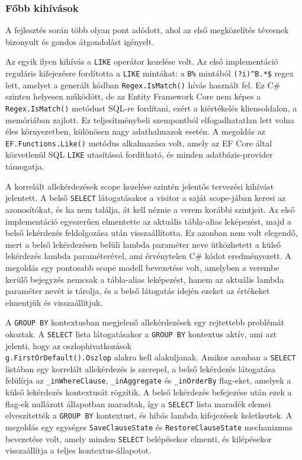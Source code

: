 \documentclass[a4paper,12pt]{article}
\begin{document}
\subsubsection{Főbb kihívások}

A fejlesztés során több olyan pont adódott, ahol az első megközelítés tévesnek bizonyult és gondos átgondolást igényelt.

Az egyik ilyen kihívás a \texttt{LIKE} operátor kezelése volt. Az első implementáció reguláris kifejezésre fordította a \texttt{LIKE} mintákat: a \texttt{B\%} mintából \texttt{(?i)\^{}B.*\$} regex lett, amelyet a generált kódban \texttt{Regex.IsMatch()} hívás használt fel. Ez C\# szinten helyesen működött, de az Entity Framework Core nem képes a \texttt{Regex.IsMatch()} metódust SQL-re fordítani, ezért a kiértékelés kliensoldalon, a memóriában zajlott. Ez teljesítménybeli szempontból elfogadhatatlan lett volna éles környezetben, különösen nagy adathalmazok esetén. A megoldás az \texttt{EF.Functions.Like()} metódus alkalmazása volt, amely az EF Core által közvetlenül SQL \texttt{LIKE} utasítássá fordítható, és minden adatbázis-provider támogatja.

A korrelált allekérdezések scope kezelése szintén jelentős tervezési kihívást jelentett. A belső \texttt{SELECT} látogatásakor a visitor a saját scope-jában keresi az azonosítókat, és ha nem találja, át kell néznie a verem korábbi szintjeit. Az első implementáció egyszerűen elmentette az aktuális tábla-alias leképezést, majd a belső lekérdezés feldolgozása után visszaállította. Ez azonban nem volt elegendő, mert a belső lekérdezésen belüli lambda paraméter neve ütközhetett a külső lekérdezés lambda paraméterével, ami érvénytelen C\# kódot eredményezett. A megoldás egy pontosabb scope modell bevezetése volt, amelyben a verembe kerülő bejegyzés nemcsak a tábla-alias leképezést, hanem az aktuális lambda paraméter nevét is tárolja, és a belső látogatás idején ezeket az értékeket elmentjük és visszaállítjuk.

A \texttt{GROUP BY} kontextusban megjelenő allekérdezések egy rejtettebb problémát okoztak. A \texttt{SELECT} lista látogatásakor a \texttt{GROUP BY} kontextus aktív, ami azt jelenti, hogy az oszlophivatkozások \\\texttt{g.FirstOrDefault().Oszlop} alakra kell alakuljanak. Amikor azonban a \texttt{SELECT} listában egy korrelált allekérdezés is szerepel, a belső lekérdezés látogatása felülírja az \texttt{\_inWhereClause}, \texttt{\_inAggregate} és \texttt{\_inOrderBy} flag-eket, amelyek a külső lekérdezés kontextusát rögzítik. A belső lekérdezés befejezése után ezek a flag-ek nullázott állapotban maradtak, így a \texttt{SELECT} lista maradék elemei elveszítették a \texttt{GROUP BY} kontextust, és hibás lambda kifejezések keletkeztek. A megoldás egy egységes \texttt{SaveClauseState} és \texttt{RestoreClauseState} mechanizmus bevezetése volt, amely minden \texttt{SELECT} belépésekor elmenti, és kilépésekor visszaállítja a teljes kontextus-állapotot.
\end{document}
